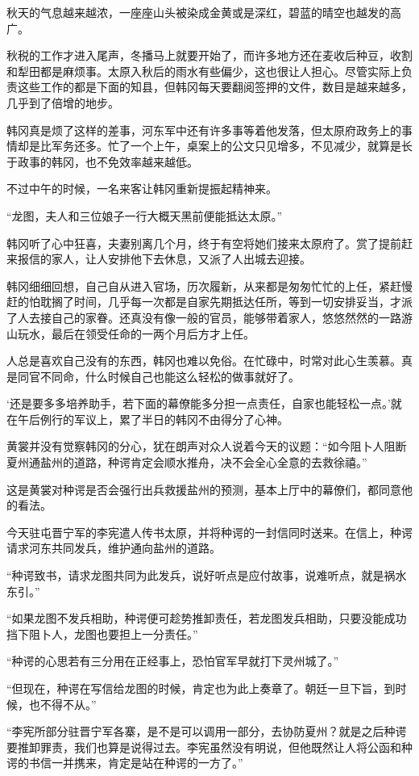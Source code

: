 秋天的气息越来越浓，一座座山头被染成金黄或是深红，碧蓝的晴空也越发的高广。

秋税的工作才进入尾声，冬播马上就要开始了，而许多地方还在麦收后种豆，收割和犁田都是麻烦事。太原入秋后的雨水有些偏少，这也很让人担心。尽管实际上负责这些工作的都是下面的知县，但韩冈每天要翻阅签押的文件，数目是越来越多，几乎到了倍增的地步。

韩冈真是烦了这样的差事，河东军中还有许多事等着他发落，但太原府政务上的事情却是比军务还多。忙了一个上午，桌案上的公文只见增多，不见减少，就算是长于政事的韩冈，也不免效率越来越低。

不过中午的时候，一名来客让韩冈重新提振起精神来。

“龙图，夫人和三位娘子一行大概天黑前便能抵达太原。”

韩冈听了心中狂喜，夫妻别离几个月，终于有空将她们接来太原府了。赏了提前赶来报信的家人，让人安排他下去休息，又派了人出城去迎接。

韩冈细细回想，自己自从进入官场，历次履新，从来都是匆匆忙忙的上任，紧赶慢赶的怕耽搁了时间，几乎每一次都是自家先期抵达任所，等到一切安排妥当，才派了人去接自己的家眷。还真没有像一般的官员，能够带着家人，悠悠然然的一路游山玩水，最后在领受任命的一两个月后方才上任。

人总是喜欢自己没有的东西，韩冈也难以免俗。在忙碌中，时常对此心生羡慕。真是同官不同命，什么时候自己也能这么轻松的做事就好了。

‘还是要多多培养助手，若下面的幕僚能多分担一点责任，自家也能轻松一点。’就在午后例行的军议上，累了半日的韩冈不由得分了心神。

黄裳并没有觉察韩冈的分心，犹在朗声对众人说着今天的议题：“如今阻卜人阻断夏州通盐州的道路，种谔肯定会顺水推舟，决不会全心全意的去救徐禧。”

这是黄裳对种谔是否会强行出兵救援盐州的预测，基本上厅中的幕僚们，都同意他的看法。

今天驻屯晋宁军的李宪遣人传书太原，并将种谔的一封信同时送来。在信上，种谔请求河东共同发兵，维护通向盐州的道路。

“种谔致书，请求龙图共同为此发兵，说好听点是应付故事，说难听点，就是祸水东引。”

“如果龙图不发兵相助，种谔便可趁势推卸责任，若龙图发兵相助，只要没能成功挡下阻卜人，龙图也要担上一分责任。”

“种谔的心思若有三分用在正经事上，恐怕官军早就打下灵州城了。”

“但现在，种谔在写信给龙图的时候，肯定也为此上奏章了。朝廷一旦下旨，到时候，也不得不从。”

“李宪所部分驻晋宁军各寨，是不是可以调用一部分，去协防夏州？就是之后种谔要推卸罪责，我们也算是说得过去。李宪虽然没有明说，但他既然让人将公函和种谔的书信一并携来，肯定是站在种谔的一方了。”

